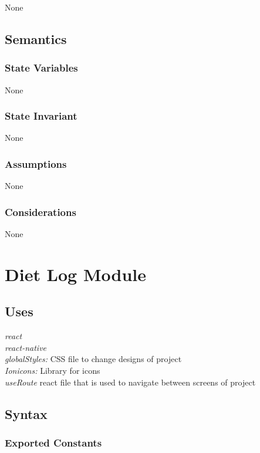 \documentclass[12pt, titlepage]{article}
\begin{document}
None

\subsection {Semantics}

\subsubsection {State Variables}

None

\subsubsection {State Invariant}

None

\subsubsection {Assumptions}

None

\subsubsection {Considerations}

None

\section{Diet Log Module} \label{Module} 

\subsection{Uses}
{\textit{react}}\\
{\textit{react-native}}\\
{\textit{globalStyles:} CSS file to change designs of project}\\
{\textit{Ionicons:} Library for icons}\\
{\textit{useRoute} react file that is used to navigate between screens of project}\\

\subsection{Syntax}

\subsubsection{Exported Constants}
\end{document}
